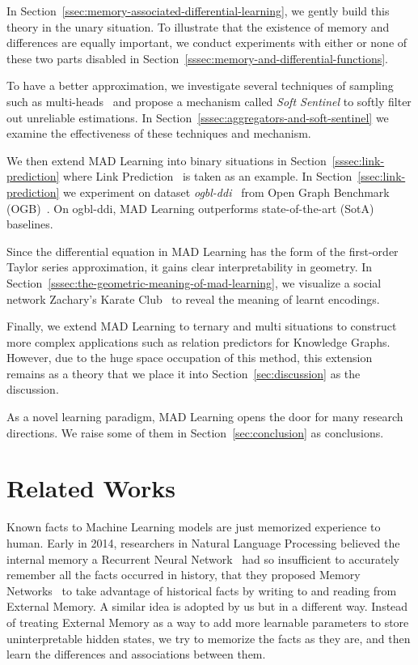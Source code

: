 \documentclass{article}
\begin{document}
In Section~\ref{ssec:memory-associated-differential-learning}, we gently
build this theory in the unary situation. To illustrate that the existence of
memory and differences are equally important, we conduct
experiments with either or none of these two parts disabled in
Section~\ref{sssec:memory-and-differential-functions}.



To have a better approximation, we investigate several techniques of
sampling such as multi-heads~\cite{1706.03762v5} and propose
a mechanism called \emph{Soft Sentinel} to softly filter out unreliable
estimations. In Section~\ref{sssec:aggregators-and-soft-sentinel} we
examine the effectiveness of these techniques and mechanism.

We then extend MAD Learning into binary situations in
Section~\ref{sssec:link-prediction} where Link
Prediction~\cite{sun2011co} is taken as an example. In
Section~\ref{ssec:link-prediction} we experiment on
dataset \emph{ogbl-ddi}~\cite{wishart2018drugbank}
from Open Graph Benchmark (OGB)~\cite{hu2020ogb}.
On ogbl-ddi, MAD Learning outperforms state-of-the-art (SotA) baselines.


Since the differential equation in MAD Learning has the form of
the first-order Taylor series approximation, it gains clear
interpretability in geometry. In
Section~\ref{sssec:the-geometric-meaning-of-mad-learning}, we visualize
a social network Zachary's Karate Club~\cite{zachary1977information} to
reveal the meaning of learnt encodings.

Finally, we extend MAD Learning to ternary and multi situations to
construct more complex applications such as relation predictors for
Knowledge Graphs. However, due to the huge space occupation of this
method, this extension remains as a theory that we place it into
Section~\ref{sec:discussion} as the discussion.

As a novel learning paradigm, MAD Learning opens the door for many
research directions. We raise some of them in
Section~\ref{sec:conclusion} as conclusions.

\hypertarget{related-works}{\section{Related Works}\label{sec:related-works}}

Known facts to Machine Learning models are just memorized experience to
human. Early in 2014, researchers in Natural Language Processing
believed the internal memory a Recurrent Neural
Network~\cite{DBLP:conf/interspeech/MikolovKBCK10} had so insufficient to
accurately remember all the facts occurred in history, that they
proposed Memory Networks~\cite{DBLP:journals/corr/WestonCB14} to take
advantage of historical facts by writing to and reading from External Memory.
A similar idea is adopted by us but in a different way. Instead of
treating External Memory as a way to add more learnable parameters to
store uninterpretable hidden states, we try to memorize the facts as
they are, and then learn the differences and associations between them.
\end{document}
